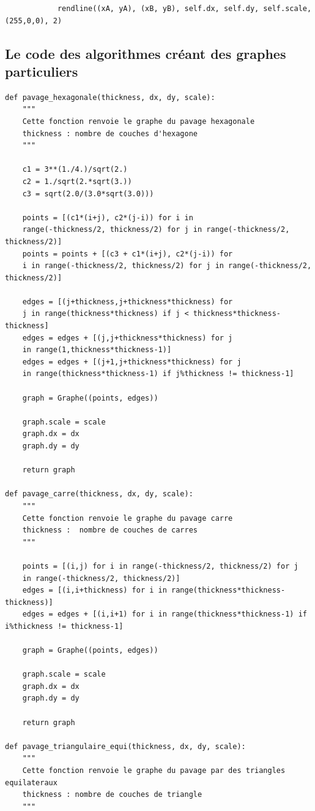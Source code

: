 \documentclass{book}
\begin{document}
\begin{appendices}
\begin{lstlisting}
            rendline((xA, yA), (xB, yB), self.dx, self.dy, self.scale, (255,0,0), 2)

\end{lstlisting}

\subsection{Le code des algorithmes créant des graphes particuliers}
\begin{lstlisting}
def pavage_hexagonale(thickness, dx, dy, scale):
    """
    Cette fonction renvoie le graphe du pavage hexagonale
    thickness : nombre de couches d'hexagone
    """
    
    c1 = 3**(1./4.)/sqrt(2.)
    c2 = 1./sqrt(2.*sqrt(3.))
    c3 = sqrt(2.0/(3.0*sqrt(3.0)))
    
    points = [(c1*(i+j), c2*(j-i)) for i in
    range(-thickness/2, thickness/2) for j in range(-thickness/2, thickness/2)]
    points = points + [(c3 + c1*(i+j), c2*(j-i)) for 
    i in range(-thickness/2, thickness/2) for j in range(-thickness/2, thickness/2)]
    
    edges = [(j+thickness,j+thickness*thickness) for
    j in range(thickness*thickness) if j < thickness*thickness-thickness]
    edges = edges + [(j,j+thickness*thickness) for j
    in range(1,thickness*thickness-1)]
    edges = edges + [(j+1,j+thickness*thickness) for j
    in range(thickness*thickness-1) if j%thickness != thickness-1]
    
    graph = Graphe((points, edges))
    
    graph.scale = scale
    graph.dx = dx
    graph.dy = dy
    
    return graph    

def pavage_carre(thickness, dx, dy, scale):
    """
    Cette fonction renvoie le graphe du pavage carre
    thickness :  nombre de couches de carres
    """
    
    points = [(i,j) for i in range(-thickness/2, thickness/2) for j 
    in range(-thickness/2, thickness/2)]
    edges = [(i,i+thickness) for i in range(thickness*thickness-thickness)]
    edges = edges + [(i,i+1) for i in range(thickness*thickness-1) if i%thickness != thickness-1]
    
    graph = Graphe((points, edges))
    
    graph.scale = scale
    graph.dx = dx
    graph.dy = dy
    
    return graph

def pavage_triangulaire_equi(thickness, dx, dy, scale):
    """
    Cette fonction renvoie le graphe du pavage par des triangles equilateraux
    thickness : nombre de couches de triangle
    """
    

\end{lstlisting}
\end{appendices}
\end{document}
